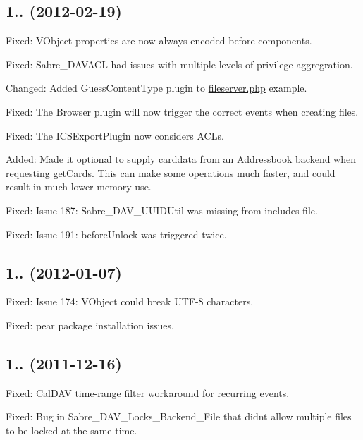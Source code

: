 \subsection*{1.. (2012-\/02-\/19) }


\begin{DoxyItemize}
\item Fixed\+: V\+Object properties are now always encoded before components.
\item Fixed\+: Sabre\+\_\+\+D\+A\+V\+A\+CL had issues with multiple levels of privilege aggregration.
\item Changed\+: Added \textquotesingle{}Guess\+Content\+Type\textquotesingle{} plugin to \mbox{\hyperlink{fileserver_8php_source}{fileserver.\+php}} example.
\item Fixed\+: The Browser plugin will now trigger the correct events when creating files.
\item Fixed\+: The I\+C\+S\+Export\+Plugin now considers A\+CL\textquotesingle{}s.
\item Added\+: Made it optional to supply carddata from an Addressbook backend when requesting get\+Cards. This can make some operations much faster, and could result in much lower memory use.
\item Fixed\+: Issue 187\+: Sabre\+\_\+\+D\+A\+V\+\_\+\+U\+U\+I\+D\+Util was missing from includes file.
\item Fixed\+: Issue 191\+: before\+Unlock was triggered twice.
\end{DoxyItemize}

\subsection*{1.. (2012-\/01-\/07) }


\begin{DoxyItemize}
\item Fixed\+: Issue 174\+: V\+Object could break U\+T\+F-\/8 characters.
\item Fixed\+: pear package installation issues.
\end{DoxyItemize}

\subsection*{1.. (2011-\/12-\/16) }


\begin{DoxyItemize}
\item Fixed\+: Cal\+D\+AV time-\/range filter workaround for recurring events.
\item Fixed\+: Bug in Sabre\+\_\+\+D\+A\+V\+\_\+\+Locks\+\_\+\+Backend\+\_\+\+File that didn\textquotesingle{}t allow multiple files to be locked at the same time.
\end{DoxyItemize}

